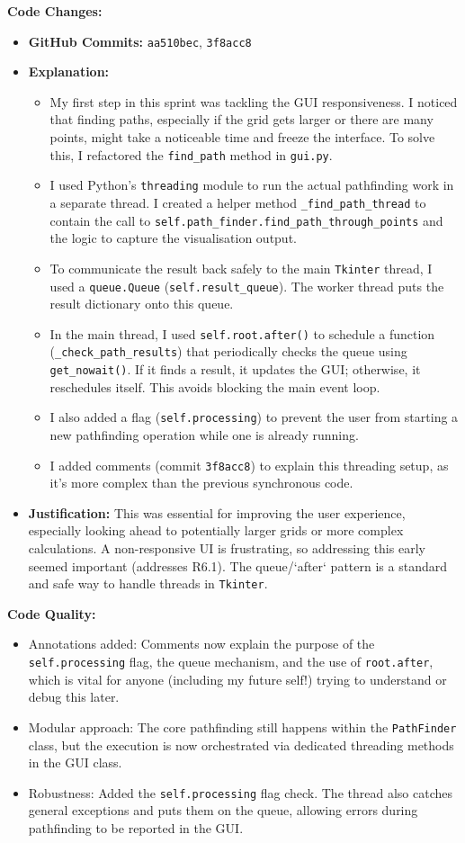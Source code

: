 \textbf{Code Changes:}
\begin{itemize}
	\item \textbf{GitHub Commits:} \verb|aa510bec|, \verb|3f8acc8|
	\item \textbf{Explanation:}
	\begin{itemize}
		\item My first step in this sprint was tackling the GUI responsiveness. I noticed that finding paths, especially if the grid gets larger or there are many points, might take a noticeable time and freeze the interface. To solve this, I refactored the \verb|find_path| method in \verb|gui.py|.
		\item I used Python's \verb|threading| module to run the actual pathfinding work in a separate thread. I created a helper method \verb|_find_path_thread| to contain the call to \verb|self.path_finder.find_path_through_points| and the logic to capture the visualisation output.
		\item To communicate the result back safely to the main \verb|Tkinter| thread, I used a \verb|queue.Queue| (\verb|self.result_queue|). The worker thread puts the result dictionary onto this queue.
		\item In the main thread, I used \verb|self.root.after()| to schedule a function (\verb|_check_path_results|) that periodically checks the queue using \verb|get_nowait()|. If it finds a result, it updates the GUI; otherwise, it reschedules itself. This avoids blocking the main event loop.
		\item I also added a flag (\verb|self.processing|) to prevent the user from starting a new pathfinding operation while one is already running.
		\item I added comments (commit \verb|3f8acc8|) to explain this threading setup, as it's more complex than the previous synchronous code.
	\end{itemize}
	\item \textbf{Justification:} This was essential for improving the user experience, especially looking ahead to potentially larger grids or more complex calculations. A non-responsive UI is frustrating, so addressing this early seemed important (addresses R6.1). The queue/`after` pattern is a standard and safe way to handle threads in \verb|Tkinter|.
\end{itemize}

\textbf{Code Quality:}
\begin{itemize}
	\item Annotations added: Comments now explain the purpose of the \verb|self.processing| flag, the queue mechanism, and the use of \verb|root.after|, which is vital for anyone (including my future self!) trying to understand or debug this later.
	\item Modular approach: The core pathfinding still happens within the \verb|PathFinder| class, but the execution is now orchestrated via dedicated threading methods in the GUI class.
	\item Robustness: Added the \verb|self.processing| flag check. The thread also catches general exceptions and puts them on the queue, allowing errors during pathfinding to be reported in the GUI.
\end{itemize}

